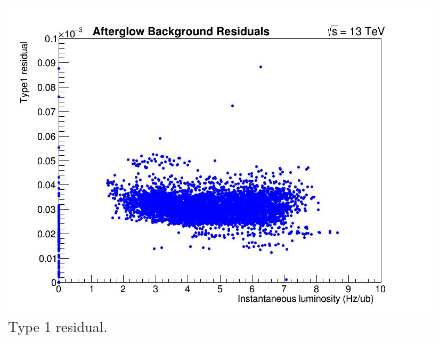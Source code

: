 \begin{itemize}





\begin{figure}[!htp]
\centering
\includegraphics[width=1\textwidth]{ashish_thesis/type1_res.png}
\caption[]{%
   Type 1 residual.                                                                                                                                                                                                              
}
\label{fig:type1}
\end{figure}


\end{itemize}
